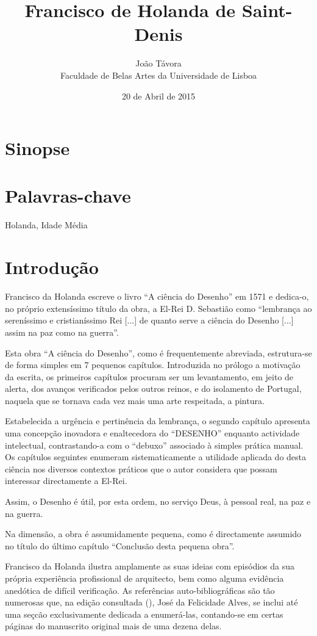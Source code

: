 \documentclass{article}
\title{Francisco de Holanda de Saint-Denis}
\date{20 de Abril de 2015}
\author{João Távora \\Faculdade de Belas Artes da Universidade de Lisboa}
\begin{document}
\maketitle

\section{Sinopse}

\section{Palavras-chave}

Holanda, Idade Média

\section{Introdução}

Francisco da Holanda escreve o livro ``A ciência do Desenho'' em 1571
e dedica-o, no próprio extensíssimo título da obra, a El-Rei
D. Sebastião como ``lembrança ao sereníssimo e cristianíssimo Rei
[...] de quanto serve a ciência do Desenho [...]  assim na paz como na
guerra''.

Esta obra ``A ciência do Desenho'', como é frequentemente abreviada,
estrutura-se de forma simples em 7 pequenos capítulos. Introduzida no
prólogo a motivação da escrita, os primeiros capítulos procuram ser um
levantamento, em jeito de alerta, dos avanços verificados pelos outros
reinos, e do isolamento de Portugal, naquela que se tornava cada vez
mais uma arte respeitada, a pintura.

Estabelecida a urgência e pertinência da lembrança, o segundo capítulo
apresenta uma concepção inovadora e enaltecedora do ``DESENHO''
enquanto actividade intelectual, contrastando-a com o ``debuxo''
associado à simples prática manual. Os capítulos seguintes enumeram
sistematicamente a utilidade aplicada do desta ciência nos diversos
contextos práticos que o autor considera que possam interessar
directamente a El-Rei.

Assim, o Desenho é útil, por esta ordem, no serviço Deus, à pessoal
real, na paz e na guerra. 

Na dimensão, a obra é assumidamente pequena, como é directamente
assumido no título do último capítulo ``Conclusão desta pequena
obra''.

Francisco da Holanda ilustra amplamente as suas ideias com episódios
da sua própria experiência profissional de arquitecto, bem como alguma
evidência anedótica de difícil verificação. As referências
auto-bibliográficas são tão numerosas que, na edição consultada
(\cite{holanda}), José da Felicidade Alves, se inclui até uma seçcão
exclusivamente dedicada a enumerá-las, contando-se em certas páginas
do manuscrito original mais de uma dezena delas.
\end{document}
